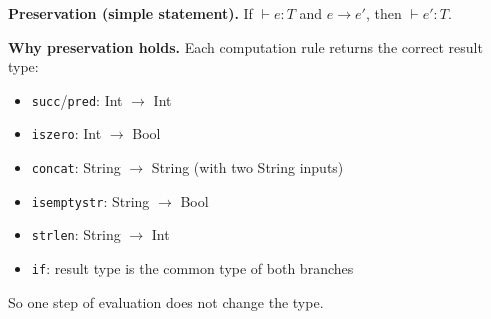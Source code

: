 \documentclass[11pt]{article}
\newcommand{\step}[2]{{#1} \rightarrow {#2}}
\newcommand{\typeof}[2]{\vdash {#1} : {#2}}
\begin{document}
\textbf{Preservation (simple statement).}
If $\typeof{e}{T}$ and $\step{e}{e'}$, then $\typeof{e'}{T}$.

\textbf{Why preservation holds.}
Each computation rule returns the correct result type:
\begin{itemize}
  \item \texttt{succ}/\texttt{pred}: Int $\rightarrow$ Int
  \item \texttt{iszero}: Int $\rightarrow$ Bool
  \item \texttt{concat}: String $\rightarrow$ String (with two String inputs)
  \item \texttt{isemptystr}: String $\rightarrow$ Bool
  \item \texttt{strlen}: String $\rightarrow$ Int
  \item \texttt{if}: result type is the common type of both branches
\end{itemize}
So one step of evaluation does not change the type.
\end{document}
